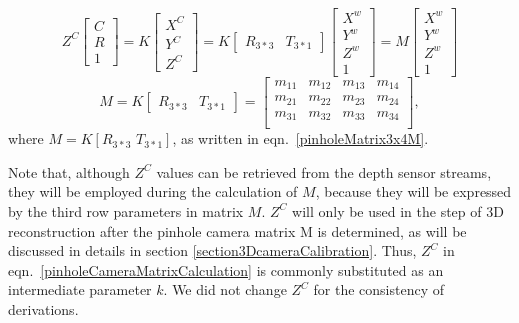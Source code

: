 \begin{equation}
Z^C\left[ \begin{array}{c} C \\ R \\ 1 \end{array} \right] %
=K \left[ \begin{array}{c} X^C \\ Y^C \\ Z^C\end{array} \right]%
=K\begin{bmatrix} R_{3*3} & T_{3*1} \end{bmatrix} \left[ \begin{array}{c} X^w \\ Y^w \\ Z^w \\ 1 \end{array} \right]%
=M \left[ \begin{array}{c} X^w \\ Y^w \\ Z^w \\ 1 \end{array} \right]%
%
\label{pinholeCameraMatrixCalculation}
\end{equation}%
%
\begin{equation}
M = K\begin{bmatrix} R_{3*3} & T_{3*1} \end{bmatrix}%
= \begin{bmatrix} 
m_{11} & m_{12} & m_{13} & m_{14} \\
m_{21} & m_{22} & m_{23} & m_{24} \\
m_{31} & m_{32} & m_{33} & m_{34} \\
\end{bmatrix} , %
\label{pinholeMatrix3x4M}
\end{equation}%
%
where \(M=K[R_{3*3} \,\, T_{3*1}]\), as written in eqn.~\ref{pinholeMatrix3x4M}. \par
%
Note that, although \(Z^C\) values can be retrieved from the depth sensor streams, they will be employed during the calculation of \(M\), because they will be expressed by the third row parameters in matrix \(M\). \(Z^C\) will only be used in the step of 3D reconstruction after the pinhole camera matrix M is determined, as will be discussed in details in section \ref{section3DcameraCalibration}. Thus, \(Z^C\) in eqn.~\ref{pinholeCameraMatrixCalculation} is commonly substituted as an intermediate parameter \(k\). We did not change \(Z^C\) for the consistency of derivations.

